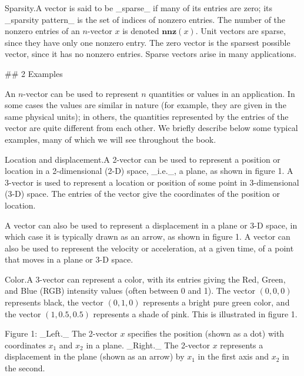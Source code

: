 Sparsity.A vector is said to be _sparse_ if many of its entries are zero; its _sparsity pattern_ is the set of indices of nonzero entries. The number of the nonzero entries of an \(n\)-vector \(x\) is denoted \(\mathbf{nnz}(x)\). Unit vectors are sparse, since they have only one nonzero entry. The zero vector is the sparsest possible vector, since it has no nonzero entries. Sparse vectors arise in many applications.

## 2 Examples

An \(n\)-vector can be used to represent \(n\) quantities or values in an application. In some cases the values are similar in nature (for example, they are given in the same physical units); in others, the quantities represented by the entries of the vector are quite different from each other. We briefly describe below some typical examples, many of which we will see throughout the book.

Location and displacement.A 2-vector can be used to represent a position or location in a 2-dimensional (2-D) space, _i.e._, a plane, as shown in figure 1. A 3-vector is used to represent a location or position of some point in 3-dimensional (3-D) space. The entries of the vector give the coordinates of the position or location.

A vector can also be used to represent a displacement in a plane or 3-D space, in which case it is typically drawn as an arrow, as shown in figure 1. A vector can also be used to represent the velocity or acceleration, at a given time, of a point that moves in a plane or 3-D space.

Color.A 3-vector can represent a color, with its entries giving the Red, Green, and Blue (RGB) intensity values (often between 0 and 1). The vector \((0,0,0)\) represents black, the vector \((0,1,0)\) represents a bright pure green color, and the vector \((1,0.5,0.5)\) represents a shade of pink. This is illustrated in figure 1.

Figure 1: _Left._ The 2-vector \(x\) specifies the position (shown as a dot) with coordinates \(x_{1}\) and \(x_{2}\) in a plane. _Right._ The 2-vector \(x\) represents a displacement in the plane (shown as an arrow) by \(x_{1}\) in the first axis and \(x_{2}\) in the second.

 